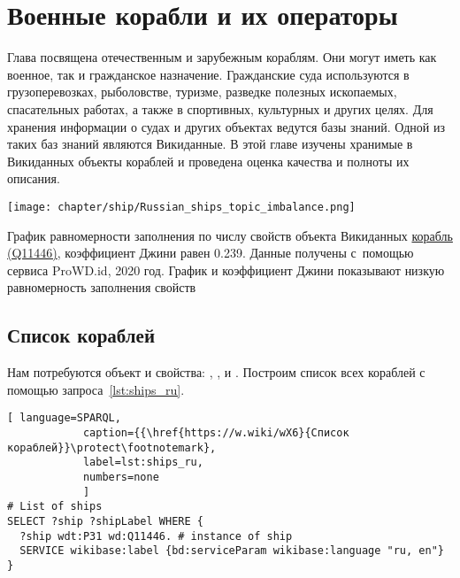 \chapter{Военные корабли и их операторы}
\label{ch:ships-chapter}

Глава посвящена отечественным и зарубежным кораблям. Они могут иметь как военное, так и гражданское назначение. Гражданские суда используются в грузоперевозках, рыболовстве, туризме, разведке полезных ископаемых, спасательных работах, а также в спортивных, культурных и других целях. Для хранения информации о судах и других объектах ведутся базы знаний. Одной из таких баз знаний являются Викиданные. В этой главе изучены хранимые в Викиданных объекты кораблей и проведена оценка качества и полноты их описания.


\begin{marginfigure}[0.0cm]
  \texttt{[image: chapter/ship/Russian\_ships\_topic\_imbalance.png]}
  \caption[График равномерности заполнения свойств объектов Викиданных.]{График равномерности заполнения по числу свойств объекта Викиданных \href{https://www.wikidata.org/wiki/Q11446}{корабль (Q11446)}, коэффициент Джини равен 0.239. Данные получены с~помощью сервиса ProWD.id, 2020 год. График и коэффициент Джини показывают низкую равномерность заполнения свойств}%
  \label{fig:prowd_ships-unbalanced}%
\end{marginfigure}


\section{Список кораблей}

Нам потребуются объект  и свойства:
   , 
   , 
    и  
   .
Построим список всех кораблей с помощью запроса~\ref{lst:ships_ru}.


\begin{lstlisting}[ language=SPARQL, 
            caption={{\href{https://w.wiki/wX6}{Список кораблей}}\protect\footnotemark}, 
            label=lst:ships_ru, 
            numbers=none
            ]
# List of ships
SELECT ?ship ?shipLabel WHERE {
  ?ship wdt:P31 wd:Q11446. # instance of ship
  SERVICE wikibase:label {bd:serviceParam wikibase:language "ru, en"}
}
\end{lstlisting}


